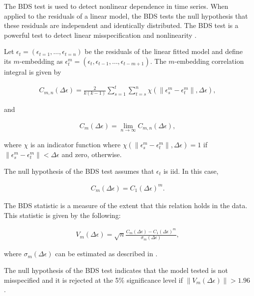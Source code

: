 \documentclass[]{book}
\theoremstyle{definition}
\theoremstyle{definition}
\theoremstyle{definition}
\theoremstyle{remark}
\begin{document}
The BDS test \cite{citeulike:9300127} is used to detect nonlinear
dependence in time series. When applied to the residuals of a linear
model, the BDS tests the null hypothesis that these residuals are
independent and identically distributed. The BDS test is a powerful test
to detect linear misspecification and nonlinearity
\cite{citeulike:9300127,Barnett97asingle-blind}.

Let \(\epsilon_t = (\epsilon_{t=1}, \ldots, \epsilon_{t=n})\) be the
residuals of the linear fitted model and define its \(m\)-embedding as
\(\epsilon_t^m = (\epsilon_{t}, \epsilon_{t-1}, \ldots, \epsilon_{t-m+1})\).
The \(m\)-embedding correlation integral is given by

\begin{align}
C_{m,n}(\Delta \epsilon) = \frac{2}{k(k-1)}\sum_{s = 1}^{t}{\sum_{t=s}^{n}{ \chi(\| \epsilon_s^m - \epsilon_t^m \|, \Delta \epsilon)    }}, \nonumber
\end{align}

and

\begin{align}
C_{m}(\Delta \epsilon) = \lim_{n\to\infty} C_{m,n}(\Delta \epsilon), \nonumber
\end{align}

where \(\chi\) is an indicator function where
\(\chi(\| \epsilon_s^m - \epsilon_t^m \|, \Delta \epsilon) = 1\) if
\(\| \epsilon_s^m - \epsilon_t^m \| < \Delta \epsilon\) and zero,
otherwise.

The null hypothesis of the BDS test assumes that \(\epsilon_t\) is iid.
In this case,

\begin{align}
C_{m}(\Delta \epsilon) = C_{1}(\Delta \epsilon)^m. \nonumber
\end{align}

The BDS statistic is a measure of the extent that this relation holds in
the data. This statistic is given by the following:

\begin{align}
V_{m}(\Delta \epsilon) = \sqrt{n}\frac{C_{m}(\Delta \epsilon) - C_{1}(\Delta \epsilon)^m}{\sigma_m(\Delta \epsilon)}, \nonumber
\end{align}

where \(\sigma_m(\Delta \epsilon)\) can be estimated as described in
\cite{citeulike:9300127}.

The null hypothesis of the BDS test indicates that the model tested is
not misspecified and it is rejected at the 5\% significance level if
\(\|V_m(\Delta \epsilon)\| > 1.96\).
\end{document}
